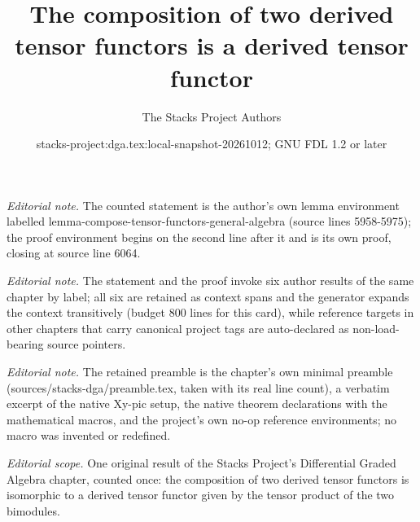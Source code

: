 \documentclass{stacks-project}
\title{The composition of two derived tensor functors is a derived tensor functor}
\author{The Stacks Project Authors}
\date{stacks-project:dga.tex:local-snapshot-20261012; GNU FDL 1.2 or later}
\theoremstyle{plain}
\theoremstyle{definition}
\theoremstyle{remark}
\numberwithin{equation}{subsection}
\begin{document}
\maketitle
\noindent\textit{Editorial note.} The counted statement is the author's own lemma environment labelled lemma-compose-tensor-functors-general-algebra (source lines 5958-5975); the proof environment begins on the second line after it and is its own proof, closing at source line 6064.\par\medskip
\noindent\textit{Editorial note.} The statement and the proof invoke six author results of the same chapter by label; all six are retained as context spans and the generator expands the context transitively (budget 800 lines for this card), while reference targets in other chapters that carry canonical project tags are auto-declared as non-load-bearing source pointers.\par\medskip
\noindent\textit{Editorial note.} The retained preamble is the chapter's own minimal preamble (sources/stacks-dga/preamble.tex, taken with its real line count), a verbatim excerpt of the native Xy-pic setup, the native theorem declarations with the mathematical macros, and the project's own no-op reference environments; no macro was invented or redefined.\par\medskip
\noindent\textit{Editorial scope.} One original result of the Stacks Project's Differential Graded Algebra chapter, counted once: the composition of two derived tensor functors is isomorphic to a derived tensor functor given by the tensor product of the two bimodules.\par\medskip
\end{document}
